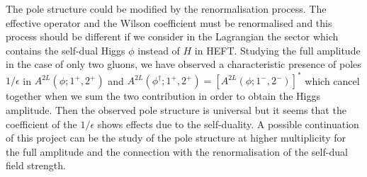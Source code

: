The pole structure could be modified by the renormalisation process. The effective operator and the Wilson coefficient must be renormalised and this process should be different if we consider in the Lagrangian the sector which contains the self-dual Higgs $\phi$ instead of $H$ in HEFT. Studying the full amplitude in the case of only two gluons, we have observed a characteristic presence of poles $1/\epsilon$ in $A^{2L}(\phi;1^+,2^+)$ and $A^{2L}(\phi^\dagger;1^+,2^+)=\left[A^{2L}(\phi;1^-,2^-)\right]^*$ which cancel together when we sum the two contribution in order to obtain the Higgs amplitude. Then the observed pole structure is universal but it seems that the coefficient of the $1/\epsilon$ shows effects due to the self-duality. A possible continuation of this project can be the study of the pole structure at higher multiplicity for the full amplitude and the connection with the renormalisation of the self-dual field strength.


